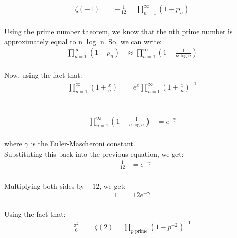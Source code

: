 \documentclass{article}
\begin{document}
\begin{align*}
\zeta(-1) &= -\frac{1}{12} = \prod_{n=1}^{\infty} (1 - p_n) \\
\end{align*}

Using the prime number theorem, we know that the nth prime number is approximately equal to  n $\log$ n. So, we can write: \\

\begin{align*}
\prod_{n=1}^{\infty} (1 - p_n) &\approx \prod_{n=1}^{\infty} \left(1 - \frac{1}{n \log n}\right) \\
\end{align*}

Now, using the fact that: \\

\begin{align*}
\prod_{n=1}^{\infty} \left(1 + \frac{x}{n}\right) &= e^x \prod_{n=1}^{\infty} \left(1 + \frac{x}{n}\right)^{-1} \\
\end{align*}

 \\

\begin{align*}
\prod_{n=1}^{\infty} \left(1 - \frac{1}{n \log n}\right) &= e^{-\gamma} \\
\end{align*}

where $\gamma$ is the Euler-Mascheroni constant. \\

Substituting this back into the previous equation, we get: \\

\begin{align*}
-\frac{1}{12} &= e^{-\gamma} \\
\end{align*}

Multiplying both sides by $-12$, we get: \\

\begin{align*}
1 &= 12e^{-\gamma} \\
\end{align*}

Using the fact that: \\

\begin{align*}
\frac{\pi^2}{6} &= \zeta(2) = \prod_{p \text{ prime}} (1 - p^{-2})^{-1} \\
\end{align*}
\end{document}
